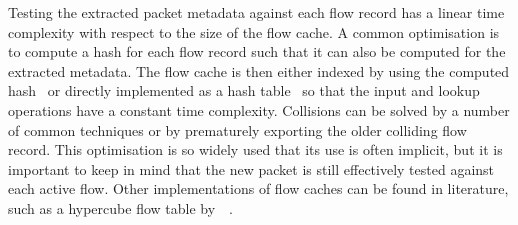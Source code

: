 Testing the extracted packet metadata against each flow record has a linear time complexity with respect to the size of the flow cache. A common optimisation is to compute a hash for each flow record such that it can also be computed for the extracted metadata. The flow cache is then either indexed by using the computed hash~\cite{Molina-2006-Design} or directly implemented as a hash table~\cite{Estan-2004-Building} so that the input and lookup operations have a constant time complexity. Collisions can be solved by a number of common techniques or by prematurely exporting the older colliding flow record. This optimisation is so widely used that its use is often implicit, but it is important to keep in mind that the new packet is still effectively tested against each active flow. Other implementations of flow caches can be found in literature, such as a hypercube flow table by~\citeauthor{Wang-2011-Memory}~\cite{Wang-2011-Memory}.

